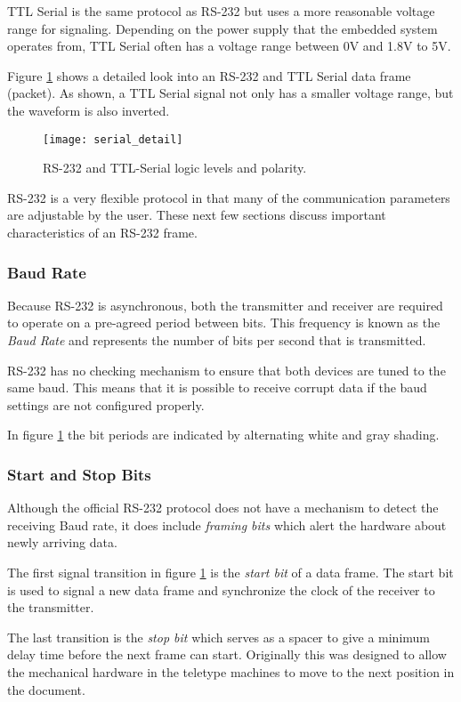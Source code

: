 \documentclass[11pt,fleqn]{book} %
\begin{document}
TTL Serial is the same protocol as RS-232 but uses a more reasonable voltage range for signaling. Depending on the power supply that the embedded system operates from, TTL Serial often has a voltage range between 0V and 1.8V to 5V. 

Figure \ref{serial_detail} shows a detailed look into an RS-232 and TTL Serial data frame (packet). As shown, a TTL Serial signal not only has a smaller voltage range, but the waveform is also inverted. 

\begin{figure}[]
    \centering\texttt{[image: serial\_detail]}
    \caption{RS-232 and TTL-Serial logic levels and polarity.}
    \label{serial_detail}
\end{figure}

RS-232 is a very flexible protocol in that many of the communication parameters are adjustable by the user. These next few sections discuss important characteristics of an RS-232 frame.  

\subsubsection{Baud Rate} 
Because RS-232 is asynchronous, both the transmitter and receiver are required to operate on a pre-agreed period between bits. This frequency is known as the \textit{Baud Rate} and represents the number of bits per second that is transmitted. 

RS-232 has no checking mechanism to ensure that both devices are tuned to the same baud. This means that it is possible to receive corrupt data if the baud settings are not configured properly. 

In figure \ref{serial_detail} the bit periods are indicated by alternating white and gray shading. 

\subsubsection{Start and Stop Bits}
Although the official RS-232 protocol does not have a mechanism to detect the receiving Baud rate, it does include \textit{framing bits} which alert the hardware about newly arriving data. 

The first signal transition in figure \ref{serial_detail} is the \textit{start bit} of a data frame. The start bit is used to signal a new data frame and synchronize the clock of the receiver to the transmitter.   

The last transition is the \textit{stop bit} which serves as a spacer to give a minimum delay time before the next frame can start. Originally this was designed to allow the mechanical hardware in the teletype machines to move to the next position in the document.
\end{document}
